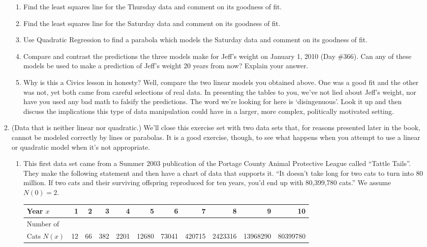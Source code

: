 \documentclass{ximera}
\begin{document}
\begin{enumerate}
\begin{enumerate}
\item Find the least squares line for the Thursday data and comment on its goodness of fit.
\item Find the least squares line for the Saturday data and comment on its goodness of fit.
\item Use Quadratic Regression to find a parabola which models the Saturday data and comment on its goodness of fit.
\item Compare and contrast the predictions the three models make for Jeff's weight on January 1, 2010 (Day \#366).  Can any of these models be used to make a prediction of Jeff's weight 20 years from now?  Explain your answer.
\item Why is this a Civics lesson in honesty?  Well, compare the two linear models you obtained above.  One was a good fit and the other was not, yet both came from careful selections of real data.  In presenting the tables to you, we've  not lied about Jeff's weight, nor have you used any bad math to falsify the predictions.  The word we're looking for here is `disingenuous'.  Look it up and then discuss the implications this type of data manipulation could have in a larger, more complex, politically motivated setting.  

\end{enumerate}

\item (Data that is neither linear nor quadratic.)  We'll close this exercise set with two data sets that, for reasons presented later in the book, cannot be modeled correctly by lines or parabolas.  It is a good exercise, though, to see what happens when you attempt to use a linear or quadratic model when it's not appropriate.

\begin{enumerate}

\item \label{APLcats} This first data set came from a Summer 2003 publication of the Portage County Animal Protective League called ``Tattle Tails''.  They make the following statement and then have a chart of data that supports it. ``It doesn't take long for two cats to turn into 80 million.  If two cats and their surviving offspring reproduced for ten years, you'd end up with 80,399,780 cats.''  We assume $N(0) = 2$.

\medskip

\scriptsize

\noindent \begin{tabular}{|l|r|r|r|r|r|r|r|r|r|r|} \hline
Year $x$ & 1 & 2 & 3 & 4 & 5 & 6 & 7 & 8 & 9 & 10 \\ 
\hline 
Number of  & & & & & & & & & & \\
Cats $N(x)$ & 12 & 66 & 382 & 2201 & 12680 & 73041 & 420715 & 2423316 & 13968290 & 80399780 \\ \hline
\end{tabular}


\end{enumerate}
\end{enumerate}
\end{document}
